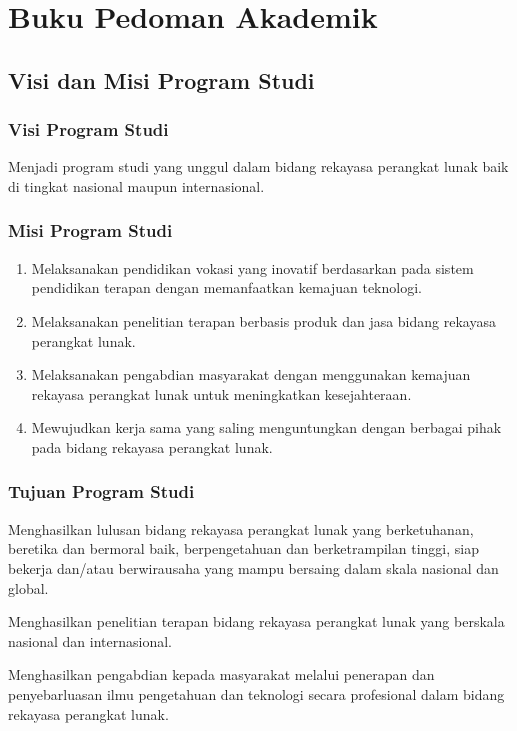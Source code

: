 \chapter{Buku Pedoman Akademik}

\section{Visi dan Misi Program Studi}

\subsection*{Visi Program Studi}
Menjadi program studi yang unggul dalam bidang rekayasa perangkat lunak baik di tingkat nasional maupun internasional.

\subsection*{Misi Program Studi}
\begin{enumerate}
\item Melaksanakan pendidikan vokasi yang inovatif berdasarkan pada sistem pendidikan terapan dengan memanfaatkan kemajuan teknologi.
\item Melaksanakan penelitian terapan berbasis produk dan jasa bidang rekayasa perangkat lunak.
\item Melaksanakan pengabdian masyarakat dengan menggunakan kemajuan rekayasa perangkat lunak untuk meningkatkan kesejahteraan.
\item Mewujudkan kerja sama yang saling menguntungkan dengan berbagai pihak pada bidang rekayasa perangkat lunak.
\end{enumerate}

\subsection*{Tujuan Program Studi}
Menghasilkan lulusan bidang rekayasa perangkat lunak yang berketuhanan, beretika dan bermoral baik, berpengetahuan dan berketrampilan tinggi, siap bekerja dan/atau berwirausaha yang mampu bersaing dalam skala nasional dan global.

Menghasilkan penelitian terapan bidang rekayasa perangkat lunak yang berskala nasional dan internasional.

Menghasilkan pengabdian kepada masyarakat melalui penerapan dan penyebarluasan ilmu pengetahuan dan teknologi secara profesional dalam bidang rekayasa perangkat lunak.

